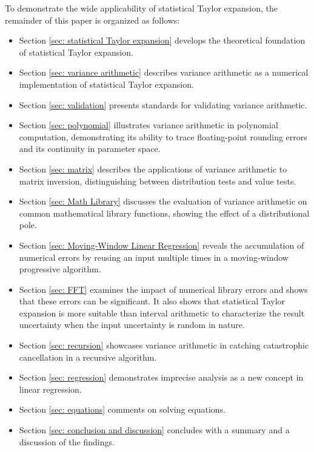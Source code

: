 \documentclass[twoside]{article}
\numberwithin{equation}{section}
\newcommand{\Verbose}{}
\begin{document}
To demonstrate the wide applicability of statistical Taylor expansion, the remainder of this paper is organized as follows:
\begin{itemize}
\item Section \ref{sec: statistical Taylor expansion} develops the theoretical foundation of statistical Taylor expansion.

\item Section \ref{sec: variance arithmetic} describes variance arithmetic as a numerical implementation of statistical Taylor expansion.

\item Section \ref{sec: validation} presents standards for validating variance arithmetic.

\item Section \ref{sec: polynomial} illustrates variance arithmetic in polynomial computation, demonstrating its ability to trace floating-point rounding errors and its continuity in parameter space.

\item Section \ref{sec: matrix} describes the applications of variance arithmetic to matrix inversion, distinguishing between distribution tests and value tests.

\item Section \ref{sec: Math Library} discusses the evaluation of variance arithmetic on common mathematical library functions, showing the effect of a distributional pole.

\ifdefined\Verbose
\item Section \ref{sec: Moving-Window Linear Regression} reveals the accumulation of numerical errors by reusing an input multiple times in a moving-window progressive algorithm.
\fi

\item Section \ref{sec: FFT} examines the impact of numerical library errors and shows that these errors can be significant.
It also shows that statistical Taylor expansion is more suitable than interval arithmetic to characterize the result uncertainty when the input uncertainty is random in nature.

\item Section \ref{sec: recursion} showcases variance arithmetic in catching catastrophic cancellation in a recursive algorithm.

\item Section \ref{sec: regression} demonstrates imprecise analysis as a new concept in linear regression.

\item Section \ref{sec: equations} comments on solving equations.

\item Section \ref{sec: conclusion and discussion} concludes with a summary and a discussion of the findings.

\end{itemize}
\end{document}
